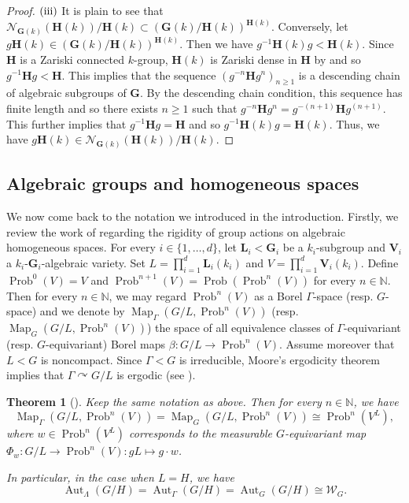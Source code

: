 \documentclass[11pt]{amsart}
\numberwithin{equation}{section}
\theoremstyle{plain}
\newtheorem{thm}{Theorem}[section]
\theoremstyle{definition}
\newcommand{\N}{\mathbb{N}}
\newcommand{\Map}{\operatorname{Map}}
\newcommand{\Aut}{\operatorname{Aut}}
\newcommand{\Prob}{\operatorname{Prob}}
\begin{document}
\begin{proof}
$(\rm iii)$ It is plain to see that $\mathscr N_{\mathbf G(k)}(\mathbf H(k))/\mathbf H(k) \subset (\mathbf G(k)/\mathbf H(k))^{\mathbf H(k)}$. Conversely, let $g \mathbf H(k) \in (\mathbf G(k)/\mathbf H(k))^{\mathbf H(k)}$. Then we have $g^{-1} \mathbf H(k) g < \mathbf H(k)$. Since $\mathbf H$ is a Zariski connected $k$-group, $\mathbf H(k)$ is Zariski dense in $\mathbf H$ by \cite[Proposition I.2.5.3(ii)]{Ma91} and so $g^{-1} \mathbf H g < \mathbf H$. This implies that the sequence $(g^{-n} \mathbf H g^n)_{n \geq 1}$ is a descending chain of algebraic subgroups of $\mathbf G$. By the descending chain condition, this sequence has finite length and so there exists $n \geq 1$ such that $g^{-n} \mathbf H g^n = g^{-(n+1)} \mathbf H g^{(n+ 1)}$. This further implies that $g^{-1} \mathbf H g = \mathbf H$ and so $g^{-1} \mathbf H(k) g = \mathbf H(k)$. Thus, we have $g \mathbf H(k) \in \mathscr N_{\mathbf G(k)}(\mathbf H(k))/\mathbf H(k)$.
\end{proof}




\subsection{Algebraic groups and homogeneous spaces}

We now come back to the notation we introduced in the introduction. Firstly, we review the work of \cite{BFGW12} regarding the rigidity of group actions on algebraic homogeneous spaces. For every $i \in \{1, \dots, d\}$, let $\mathbf L_i < \mathbf G_i$ be a $k_i$-subgroup and $\mathbf V_i$ a $k_i$-$\mathbf G_i$-algebraic variety. Set $L =  \prod_{i = 1}^d \mathbf L_i(k_i)$ and $V = \prod_{i = 1}^d \mathbf V_i(k_i)$. Define $\Prob^0(V) = V$ and $\Prob^{n + 1}(V) = \Prob(\Prob^n(V))$ for every $n \in \N$. Then for every $n \in \N$, we may regard $\Prob^n(V)$ as a Borel $\Gamma$-space (resp.\! $G$-space) and we denote by $\Map_\Gamma(G/L, \Prob^n(V))$ (resp.\! $\Map_G(G/L, \Prob^n(V))$) the space of all equivalence classes of $\Gamma$-equivariant (resp.\! $G$-equivariant) Borel maps $\beta : G/L \to \Prob^n(V)$. Assume moreover that $L < G$ is noncompact. Since $\Gamma < G$ is irreducible, Moore's ergodicity theorem implies that $\Gamma \curvearrowright G/L$ is ergodic (see \cite{HM77}). 

\begin{thm}[{\cite[Theorem 1.6]{BFGW12}}]\label{thm-equivariant}
Keep the same notation as above. Then for every $n \in \N$, we have
$$\Map_\Gamma(G/L, \Prob^n(V)) = \Map_G(G/L, \Prob^n(V)) \cong \Prob^n(V^L),$$
where $w \in \Prob^n(V^L)$ corresponds to the measurable $G$-equivariant map $\Phi_w : G/L \to \Prob^n(V) : gL \mapsto g \cdot w$.
 
In particular, in the case when $L = H$, we have 
$$\Aut_\Lambda(G/H) = \Aut_\Gamma(G/H) = \Aut_G(G/H) \cong \mathscr W_G.$$
\end{thm}
\end{document}

